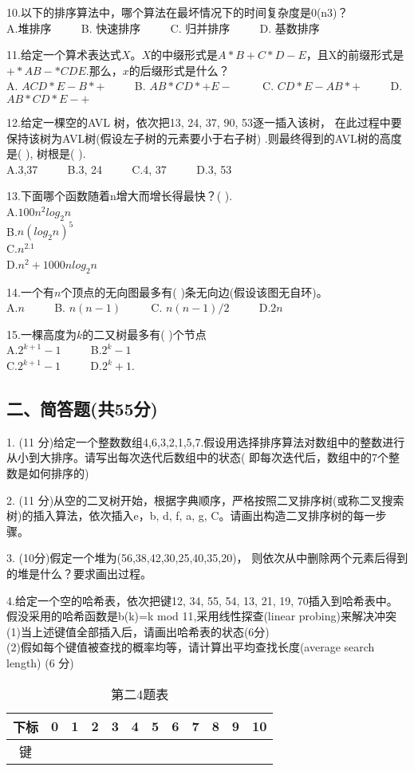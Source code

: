 10.以下的排序算法中，哪个算法在最坏情况下的时间复杂度是0(n3)？ \\
A.堆排序  $\qquad$ B. 快速排序  $\qquad$ C. 归并排序 $\qquad$ D. 基数排序

11.给定一个算术表达式$X$。$X$的中缀形式是$A*B+C*D-E$，且X的前缀形式是$+*AB-*CDE$.那么，$x$的后缀形式是什么？ \\
A. $ACD*E-B*+$ $\qquad$ B. $AB*CD*+E-$ $\qquad$ C. $CD*E-AB*+$ $\qquad$ D. $AB*CD*E-+$

12.给定一棵空的AVL 树，依次把13, 24, 37, 90, 53逐一插入该树， 在此过程中要保持该树为AVL树(假设左子树的元素要小于右子树) .则最终得到的AVL树的高度是( ), 树根是( ). \\
A.3,37 $\qquad$ B.3, 24 $\qquad$ C.4, 37 $\qquad$ D.3, 53

13.下面哪个函数随着n增大而增长得最快？( ). \\
A.$100n^2log_2n$ \\
B.$n(log_2n)^5$ \\
C.$n^{2.1}$ \\
D.$n^2+1000nlog_2n$

14.一个有$n$个顶点的无向图最多有( )条无向边(假设该图无自环)。 \\
A.$n$ $\qquad$ B. $n(n-1)$ $\qquad$ C. $n(n-1)/2$ $\qquad$ D.$2n$

15.一棵高度为$k$的二又树最多有( )个节点 \\
A.$2^{k+1}-1$ $\qquad$ B.$2^k-1$ \\
C.$2^{k+1}-1$ $\qquad$ D.$2^k+1$.

\subsection{二、简答题(共55分)}
1. (11 分)给定一个整数数组{4,6,3,2,1,5,7}.假设用选择排序算法对数组中的整数进行从小到大排序。请写出每次迭代后数组中的状态( 即每次迭代后，数组中的7个整数是如何排序的)

2. (11 分)从空的二叉树开始，根据字典顺序，严格按照二叉排序树(或称二叉搜索树)的插入算法，依次插入e，b, d, f, a, g, C。请画出构造二叉排序树的每一步骤。

3. (10分)假定一个堆为(56,38,42,30,25,40,35,20)， 则依次从中删除两个元素后得到的堆是什么？要求画出过程。

4.给定一个空的哈希表，依次把键12, 34, 55, 54, 13, 21, 19, 70插入到哈希表中。假没采用的哈希函数是b(k)=k mod 11,采用线性探查(linear probing)来解决冲突 \\
(1)当上述键值全部插入后，请画出哈希表的状态(6分) \\
(2)假如每个键值被查找的概率均等，请计算出平均查找长度(average search length) (6 分)
\begin{table}[ht]
\centering
\caption{第二4题表}\label{SYDS15_tab1}
\begin{tabular}{|c|c|c|c|c|c|c|c|c|c|c|c|}
\hline
下标 & 0 & 1 & 2 & 3 & 4 & 5 & 6 & 7 & 8 & 9 & 10 \\
\hline
键 &  &  &  &  &  &  &  &  &  &  & \\
\hline
\end{tabular}
\end{table}


